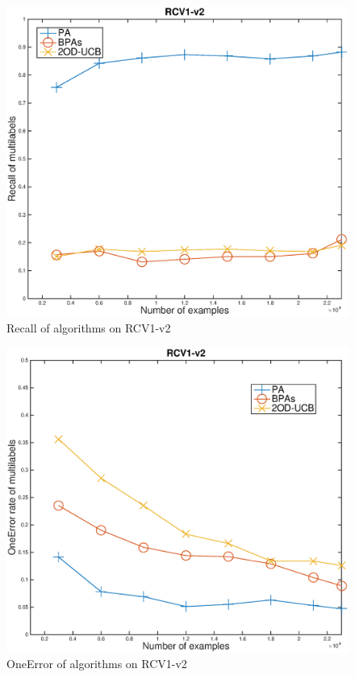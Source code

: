 \begin{figure}[h!]
\vspace{.2in}
\centerline{
\includegraphics[scale = 0.6]{fig05/ml/recallrcv1.eps}}
\caption{Recall of algorithms on RCV1-v2}
\label{pig:rcvRe}
\end{figure}

\begin{figure}[h!]
\vspace{.2in}
\centerline{
\includegraphics[scale = 0.6]{fig05/ml/oneErrorrcv1.eps}}
\caption{OneError of algorithms on RCV1-v2}
\label{pig:rcvOE}
\end{figure}


